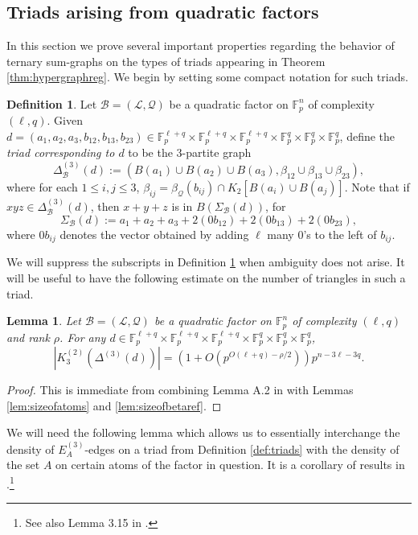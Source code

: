 \documentclass[12pt,oneside,british,a4wide]{amsart}
\newtheorem{lemma}[theorem]{Lemma}
\numberwithin{equation}{section}
\theoremstyle{definition}
\newtheorem{definition}[theorem]{Definition}
\def\F{\mathbb{F}}
\newcommand{\calL}{\mathcal{L}}
\newcommand{\calB}{\mathcal{B}}
\newcommand{\calQ}{\mathcal{Q}}
\begin{document}
\subsection{Triads arising from quadratic factors}

In this section we prove several important properties regarding the behavior of ternary sum-graphs on the types of triads appearing in Theorem \ref{thm:hypergraphreg}.  We begin by setting some compact notation for such triads.   

\begin{definition}\label{def:triads2}
Let $\calB=(\calL,\calQ)$ be a quadratic factor  on $\F_p^n$ of complexity $(\ell,q)$. Given $d=(a_1,a_2,a_3,b_{12},b_{13},b_{23})\in \mathbb{F}_p^{\ell+q}\times \mathbb{F}_p^{\ell+q}\times \mathbb{F}_p^{\ell+q}\times \mathbb{F}_p^{q}\times \mathbb{F}_p^{q}\times \mathbb{F}_p^{q}$, define the \emph{triad corresponding to $d$} to be the $3$-partite graph
$$
\Delta_{\calB}^{(3)}(d):=(B(a_1)\cup B(a_2)\cup B(a_3), \beta_{12}\cup \beta_{13}\cup \beta_{23}), 
$$
where for each $1\leq i,j\leq 3$, $\beta_{ij}=\beta_{\calQ}(b_{ij})\cap K_2[B(a_i)\cup B(a_j)]$.  Note that if $xyz\in \Delta_{\calB}^{(3)}(d)$, then $x+y+z$ is in $B(\Sigma_{\calB}(d))$, for
$$
\Sigma_{\calB}(d):=a_1+a_2+a_3+2(0b_{12})+2(0b_{13})+2(0b_{23}),
$$
where $0b_{ij}$ denotes the vector obtained by adding $\ell$ many $0$'s to the left of $b_{ij}$.
\end{definition}
We will suppress the subscripts in Definition \ref{def:triads2} when ambiguity does not arise. It will be useful to have the following estimate on the number of triangles in such a triad.

\begin{lemma}\label{lem:qrcount}
Let $\calB=(\calL,\calQ)$ be a quadratic factor  on $\F_p^n$ of complexity $(\ell,q)$ and rank $\rho$. For any $d\in \mathbb{F}_p^{\ell+q}\times \mathbb{F}_p^{\ell+q}\times \mathbb{F}_p^{\ell+q}\times \mathbb{F}_p^{q}\times \mathbb{F}_p^{q}\times \mathbb{F}_p^{q}$,
$$
|K_3^{(2)}(\Delta^{(3)}(d))|=(1+O(p^{O(\ell+q)-\rho/2}))p^{n-3\ell-3q}.
$$
\end{lemma}
\begin{proof}
This is immediate from combining Lemma A.2 in \cite{Terry.2021d} with Lemmas \ref{lem:sizeofatoms} and  \ref{lem:sizeofbetaref}.  
\end{proof}

We will need the following lemma which allows us to essentially interchange the density of $E_A^{(3)}$-edges on a triad from Definition \ref{def:triads} with the density of the set $A$ on certain atoms of the factor in question.  It is a corollary of results in \cite{Terry.2021d}.\footnote{See also Lemma 3.15 in \cite{Terry.2021av2}.}
\end{document}
